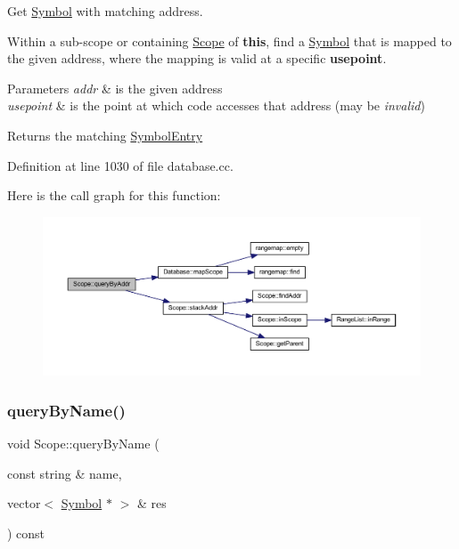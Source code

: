 Get \mbox{\hyperlink{class_symbol}{Symbol}} with matching address. 

Within a sub-\/scope or containing \mbox{\hyperlink{class_scope}{Scope}} of {\bfseries{this}}, find a \mbox{\hyperlink{class_symbol}{Symbol}} that is mapped to the given address, where the mapping is valid at a specific {\bfseries{usepoint}}. 
\begin{DoxyParams}{Parameters}
{\em addr} & is the given address \\
\hline
{\em usepoint} & is the point at which code accesses that address (may be {\itshape invalid}) \\
\hline
\end{DoxyParams}
\begin{DoxyReturn}{Returns}
the matching \mbox{\hyperlink{class_symbol_entry}{Symbol\+Entry}} 
\end{DoxyReturn}


Definition at line 1030 of file database.\+cc.

Here is the call graph for this function\+:
\nopagebreak
\begin{figure}[H]
\begin{center}
\leavevmode
\includegraphics[width=350pt]{class_scope_afc95566b073624a0d12231a8e70bc5ce_cgraph}
\end{center}
\end{figure}
\mbox{\label{class_scope_ae7d2e4eeed5fbc77e0477936f60cfde5}} 
\subsubsection{\texorpdfstring{queryByName()}{queryByName()}}
{\footnotesize\ttfamily void Scope\+::query\+By\+Name (\begin{DoxyParamCaption}\item[{const string \&}]{name,  }\item[{vector$<$ \mbox{\hyperlink{class_symbol}{Symbol}} $\ast$ $>$ \&}]{res }\end{DoxyParamCaption}) const}



